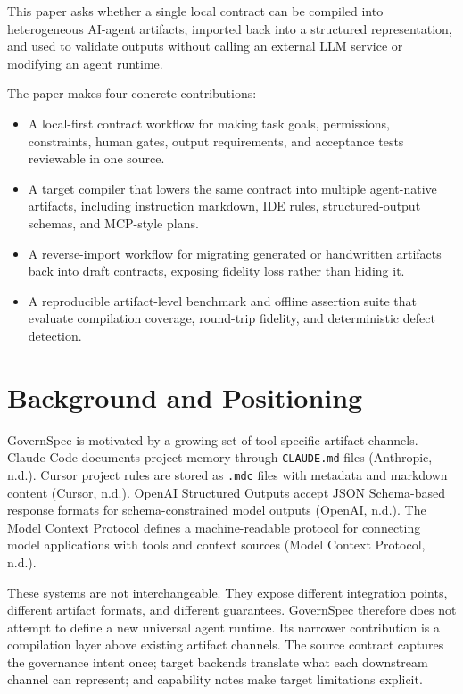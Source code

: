 \documentclass[11pt]{article}
\begin{document}
This paper asks whether a single local contract can be compiled into heterogeneous
AI-agent artifacts, imported back into a structured representation, and used to
validate outputs without calling an external LLM service or modifying an agent
runtime.

The paper makes four concrete contributions:
\begin{itemize}
  \item A local-first contract workflow for making task goals, permissions,
  constraints, human gates, output requirements, and acceptance tests reviewable in
  one source.
  \item A target compiler that lowers the same contract into multiple agent-native
  artifacts, including instruction markdown, IDE rules, structured-output schemas,
  and MCP-style plans.
  \item A reverse-import workflow for migrating generated or handwritten artifacts
  back into draft contracts, exposing fidelity loss rather than hiding it.
  \item A reproducible artifact-level benchmark and offline assertion suite that
  evaluate compilation coverage, round-trip fidelity, and deterministic defect
  detection.
\end{itemize}

\section{Background and Positioning}

GovernSpec is motivated by a growing set of tool-specific artifact channels. Claude
Code documents project memory through \texttt{CLAUDE.md} files (Anthropic, n.d.).
Cursor project rules are stored as \texttt{.mdc} files with metadata and markdown
content (Cursor, n.d.). OpenAI Structured Outputs accept JSON Schema-based response
formats for schema-constrained model outputs (OpenAI, n.d.). The Model Context
Protocol defines a machine-readable protocol for connecting model applications with
tools and context sources (Model Context Protocol, n.d.).

These systems are not interchangeable. They expose different integration points,
different artifact formats, and different guarantees. GovernSpec therefore does not
attempt to define a new universal agent runtime. Its narrower contribution is a
compilation layer above existing artifact channels. The source contract captures the
governance intent once; target backends translate what each downstream channel can
represent; and capability notes make target limitations explicit.
\end{document}

